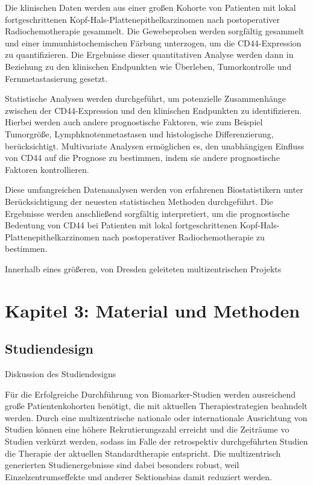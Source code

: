 Die klinischen Daten werden aus einer großen Kohorte von Patienten mit lokal fortgeschrittenen Kopf-Hals-Plattenepithelkarzinomen nach postoperativer Radiochemotherapie gesammelt. Die Gewebeproben werden sorgfältig gesammelt und einer immunhistochemischen Färbung unterzogen, um die CD44-Expression zu quantifizieren. Die Ergebnisse dieser quantitativen Analyse werden dann in Beziehung zu den klinischen Endpunkten wie Überleben, Tumorkontrolle und Fernmetastasierung gesetzt.

Statistische Analysen werden durchgeführt, um potenzielle Zusammenhänge zwischen der CD44-Expression und den klinischen Endpunkten zu identifizieren. Hierbei werden auch andere prognostische Faktoren, wie zum Beispiel Tumorgröße, Lymphknotenmetastasen und histologische Differenzierung, berücksichtigt. Multivariate Analysen ermöglichen es, den unabhängigen Einfluss von CD44 auf die Prognose zu bestimmen, indem sie andere prognostische Faktoren kontrollieren.

Diese umfangreichen Datenanalysen werden von erfahrenen Biostatistikern unter Berücksichtigung der neuesten statistischen Methoden durchgeführt. Die Ergebnisse werden anschließend sorgfältig interpretiert, um die prognostische Bedeutung von CD44 bei Patienten mit lokal fortgeschrittenen Kopf-Hals-Plattenepithelkarzinomen nach postoperativer Radiochemotherapie zu bestimmen.

Innerhalb eines größeren, von Dresden geleiteten multizentrischen Projekts

\hypertarget{kapitel-3-material-und-methoden}{%
\section{Kapitel 3: Material und Methoden}\label{kapitel-3-material-und-methoden}}

\hypertarget{studiendesign}{%
\subsection{Studiendesign}\label{studiendesign}}

Diskussion des Studiendesigns

Für die Erfolgreiche Durchführung von Biomarker-Studien werden ausreichend große Patientenkohorten benötigt, die mit aktuellen Therapiestrategien beahndelt werden. Durch eine multizentrische nationale oder internationale Ausrichtung von Studien können eine höhere Rekrutierungszahl erreicht und die Zeiträume vo Studien verkürzt werden, sodass im Falle der retrospektiv durchgeführten Studien die Therapie der aktuellen Standardtherapie entspricht. Die multizentrisch generierten Studienergebnisse sind dabei besonders robust, weil Einzelzentrumseffekte und anderer Sektionsbias damit reduziert werden.

